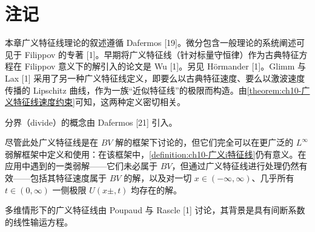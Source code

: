 \documentclass[../../main.tex]{subfiles}
\begin{document}
\section{注记}\label{section:ch10-注记}

本章广义特征线理论的叙述遵循 Dafermos [19]。微分包含一般理论的系统阐述可见于 Filippov 的专著 [1]。早期将广义特征线（针对标量守恒律）作为古典特征方程在 Filippov 意义下的解引入的论文是 Wu [1]。另见 Hörmander [1]。Glimm 与 Lax [1] 采用了另一种广义特征线定义，即要么以古典特征速度、要么以激波速度传播的 Lipschitz 曲线，作为一族“近似特征线”的极限而构造。由\cref{theorem:ch10-广义特征线速度约束}可知，这两种定义密切相关。

分界（divide）的概念由 Dafermos [21] 引入。

尽管此处广义特征线是在 $BV$ 解的框架下讨论的，但它们完全可以在更广泛的 $L^{\infty}$ 弱解框架中定义和使用：在该框架中，\cref{definition:ch10-广义i特征线}仍有意义。在应用中遇到的一类弱解——它们未必属于 $BV$，但通过广义特征线进行处理仍然有效——包括其特征速度属于 $BV$ 的解，以及对一切 $x\in(-\infty,\infty)$、几乎所有 $t\in(0,\infty)$ 一侧极限 $U(x\pm,t)$ 均存在的解。

多维情形下的广义特征线由 Poupaud 与 Rascle [1] 讨论，其背景是具有间断系数的线性输运方程。
\end{document}
